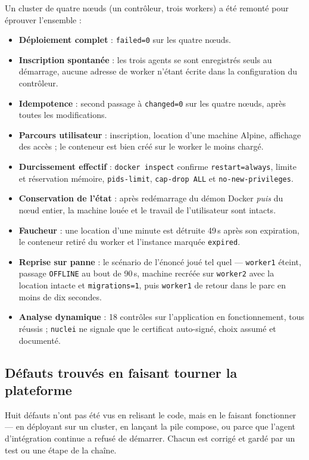 \documentclass[11pt,a4paper]{article}
\begin{document}
Un cluster de quatre n\oe{}uds (un contrôleur, trois workers) a été remonté pour éprouver l'ensemble :

\begin{itemize}
\item \textbf{Déploiement complet} : \texttt{failed=0} sur les quatre n\oe{}uds.
\item \textbf{Inscription spontanée} : les trois agents se sont enregistrés seuls au démarrage,
aucune adresse de worker n'étant écrite dans la configuration du contrôleur.
\item \textbf{Idempotence} : second passage à \texttt{changed=0} sur les quatre n\oe{}uds, après toutes
les modifications.
\item \textbf{Parcours utilisateur} : inscription, location d'une machine Alpine, affichage des accès ;
le conteneur est bien créé sur le worker le moins chargé.
\item \textbf{Durcissement effectif} : \texttt{docker inspect} confirme \texttt{restart=always},
limite et réservation mémoire, \texttt{pids-limit}, \texttt{cap-drop ALL} et \texttt{no-new-privileges}.
\item \textbf{Conservation de l'état} : après redémarrage du démon Docker \emph{puis} du n\oe{}ud entier,
la machine louée et le travail de l'utilisateur sont intacts.
\item \textbf{Faucheur} : une location d'une minute est détruite 49\,s après son expiration, le
conteneur retiré du worker et l'instance marquée \texttt{expired}.
\item \textbf{Reprise sur panne} : le scénario de l'énoncé joué tel quel --- \texttt{worker1} éteint,
passage \texttt{OFFLINE} au bout de 90\,s, machine recréée sur \texttt{worker2} avec la location
intacte et \texttt{migrations=1}, puis \texttt{worker1} de retour dans le parc en moins de dix secondes.
\item \textbf{Analyse dynamique} : 18 contrôles sur l'application en fonctionnement, tous réussis ;
\texttt{nuclei} ne signale que le certificat auto-signé, choix assumé et documenté.
\end{itemize}

\subsection*{Défauts trouvés en faisant tourner la plateforme}

Huit défauts n'ont pas été vus en relisant le code, mais en le faisant
fonctionner --- en déployant sur un cluster, en lançant la pile compose, ou
parce que l'agent d'intégration continue a refusé de démarrer. Chacun est
corrigé et gardé par un test ou une étape de la chaîne.
\end{document}
